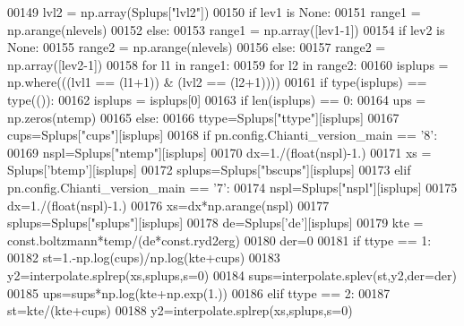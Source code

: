 \begin{DoxyCode}
00149     lvl2 = np.array(Splups[\textcolor{stringliteral}{"lvl2"}])
00150     \textcolor{keywordflow}{if} lev1 \textcolor{keywordflow}{is} \textcolor{keywordtype}{None}:
00151         range1 = np.arange(nlevels)
00152     \textcolor{keywordflow}{else}:
00153         range1 = np.array([lev1-1])
00154     \textcolor{keywordflow}{if} lev2 \textcolor{keywordflow}{is} \textcolor{keywordtype}{None}:
00155         range2 = np.arange(nlevels)
00156     \textcolor{keywordflow}{else}:
00157         range2 = np.array([lev2-1])
00158     \textcolor{keywordflow}{for} l1 \textcolor{keywordflow}{in} range1:
00159         \textcolor{keywordflow}{for} l2 \textcolor{keywordflow}{in} range2:
00160             isplups = np.where(((lvl1 == (l1+1)) & (lvl2 == (l2+1))))
00161             \textcolor{keywordflow}{if} type(isplups) == type(()):
00162                 isplups = isplups[0]                
00163             \textcolor{keywordflow}{if} len(isplups) == 0:
00164                 ups = np.zeros(ntemp)
00165             \textcolor{keywordflow}{else}:
00166                 ttype=Splups[\textcolor{stringliteral}{"ttype"}][isplups]
00167                 cups=Splups[\textcolor{stringliteral}{"cups"}][isplups]
00168                 \textcolor{keywordflow}{if} pn.config.Chianti\_version\_main == \textcolor{stringliteral}{'8'}:
00169                     nspl=Splups[\textcolor{stringliteral}{"ntemp"}][isplups]
00170                     dx=1./(float(nspl)-1.)
00171                     xs = Splups[\textcolor{stringliteral}{'btemp'}][isplups]
00172                     splups=Splups[\textcolor{stringliteral}{"bscups"}][isplups]
00173                 \textcolor{keywordflow}{elif} pn.config.Chianti\_version\_main == \textcolor{stringliteral}{'7'}:
00174                     nspl=Splups[\textcolor{stringliteral}{"nspl"}][isplups]
00175                     dx=1./(float(nspl)-1.)
00176                     xs=dx*np.arange(nspl)
00177                     splups=Splups[\textcolor{stringliteral}{"splups"}][isplups]
00178                 de=Splups[\textcolor{stringliteral}{'de'}][isplups]
00179                 kte = const.boltzmann*temp/(de*const.ryd2erg)
00180                 der=0
00181                 \textcolor{keywordflow}{if} ttype == 1:
00182                     st=1.-np.log(cups)/np.log(kte+cups)
00183                     y2=interpolate.splrep(xs,splups,s=0)
00184                     sups=interpolate.splev(st,y2,der=der)
00185                     ups=sups*np.log(kte+np.exp(1.))
00186                 \textcolor{keywordflow}{elif} ttype == 2:
00187                     st=kte/(kte+cups)
00188                     y2=interpolate.splrep(xs,splups,s=0)

\end{DoxyCode}
